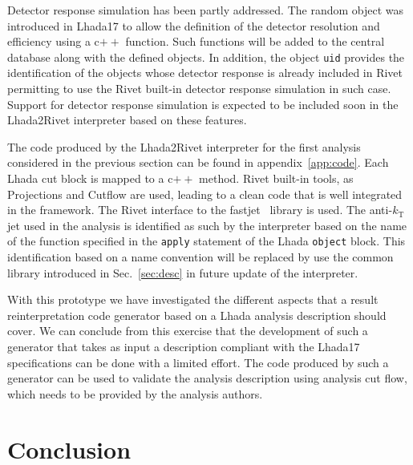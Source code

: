 \documentclass[11pt]{cernrep}
\begin{document}
Detector response simulation has been partly addressed. The random object was introduced in {\sc Lhada17} to allow the definition of  the detector resolution and efficiency using a c$++$ function.  Such functions will be added to the central database along with the defined objects. In addition, the object {\tt uid} provides the identification of the objects whose detector response is already included in {\sc Rivet} permitting to use the Rivet built-in detector response simulation in such case. Support for detector response simulation is expected to be included soon in the {\sc Lhada2Rivet} interpreter based on these features.

The code produced by the {\sc Lhada2Rivet} interpreter for the first analysis considered in the previous section can be found in appendix~\ref{app:code}. Each {\sc Lhada} cut block is mapped to a c$++$ method. Rivet built-in tools, as Projections and Cutflow are used, leading to a clean code that is well integrated in the framework. The {\sc Rivet} interface to the fastjet~\cite{Cacciari:2011ma} library is used. The anti-$k_{\text{T}}$ jet used in the analysis is identified as such by the interpreter based on the name of the function specified in the {\tt apply} statement of the {\sc Lhada} {\tt object} block. This identification based on a name convention will be replaced by use the common library introduced in Sec.~\ref{sec:desc} in future update of the interpreter.

With this prototype we have investigated the different aspects that a result reinterpretation code generator based on a {\sc Lhada} analysis description should cover. We can conclude from this exercise that the development of such a generator that takes as input a description compliant with the {\sc Lhada17} specifications can be done with a limited effort. The code produced by such a generator can be used to validate the analysis description using analysis cut flow, which needs to be provided by the analysis authors. 


%


\section{Conclusion}
\end{document}
